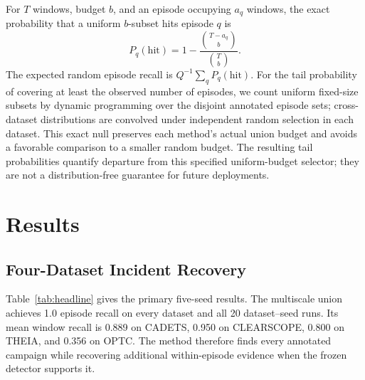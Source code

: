 \documentclass[lettersize,journal]{IEEEtran}
\begin{document}
For $T$ windows, budget $b$, and an episode occupying $a_q$ windows, the exact
probability that a uniform $b$-subset hits episode $q$ is
\begin{equation}
 P_q(\mathrm{hit})=1-\frac{\binom{T-a_q}{b}}{\binom{T}{b}}.
 \label{eq:randomhit}
\end{equation}
The expected random episode recall is
$Q^{-1}\sum_qP_q(\mathrm{hit})$.  For the tail probability of covering at least
the observed number of episodes, we count uniform fixed-size subsets by dynamic
programming over the disjoint annotated episode sets; cross-dataset
distributions are convolved under independent random selection in each dataset.
This exact null preserves each method's actual union budget and avoids a
favorable comparison to a smaller random budget.
The resulting tail probabilities quantify departure from this specified
uniform-budget selector; they are not a distribution-free guarantee for future
deployments.

\section{Results}
\label{sec:results}

\subsection{Four-Dataset Incident Recovery}

Table~\ref{tab:headline} gives the primary five-seed results.  The multiscale
union achieves 1.0 episode recall on every dataset and all 20 dataset--seed
runs.  Its mean window recall is 0.889 on CADETS, 0.950 on CLEARSCOPE, 0.800 on
THEIA, and 0.356 on OPTC.  The method therefore finds every annotated campaign
while recovering additional within-episode evidence when the frozen detector
supports it.
\end{document}
